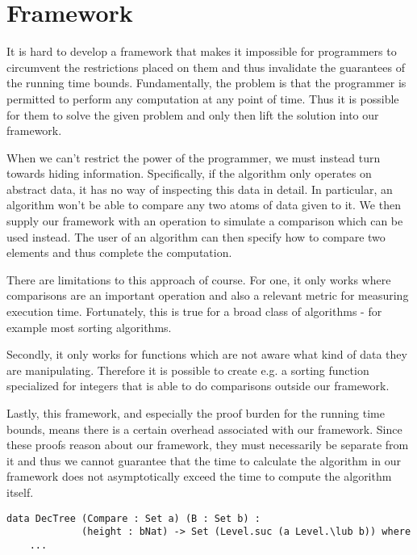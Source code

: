 
\chapter{Framework}

It is hard to develop a framework that makes it impossible for programmers to circumvent the restrictions placed on them and thus invalidate the guarantees of the running time bounds. Fundamentally, the problem is that the programmer is permitted to perform any computation at any point of time. Thus it is possible for them to solve the given problem and only then lift the solution into our framework.

When we can't restrict the power of the programmer, we must instead turn towards hiding information. Specifically, if the algorithm only operates on abstract data, it has no way of inspecting this data in detail. In particular, an algorithm won't be able to compare any two atoms of data given to it. We then supply our framework with an operation to simulate a comparison which can be used instead. The user of an algorithm can then specify how to compare two elements and thus complete the computation.

There are limitations to this approach of course. For one, it only works where comparisons are an important operation and also a relevant metric for measuring execution time. Fortunately, this is true for a broad class of algorithms - for example most sorting algorithms.

Secondly, it only works for functions which are not aware what kind of data they are manipulating. Therefore it is possible to create e.g. a sorting function specialized for integers that is able to do comparisons outside our framework.

Lastly, this framework, and especially the proof burden for the running time bounds, means there is a certain overhead associated with our framework. Since these proofs reason about our framework, they must necessarily be separate from it and thus we cannot guarantee that the time to calculate the algorithm in our framework does not asymptotically exceed the time to compute the algorithm itself.


\begin{lstlisting}[caption={The DecTree Monad},label={lst:dectree:1},emph={DecTree,Set,Level}]
data DecTree (Compare : Set a) (B : Set b) :
             (height : bNat) -> Set (Level.suc (a Level.\lub b)) where
    ...
\end{lstlisting}

